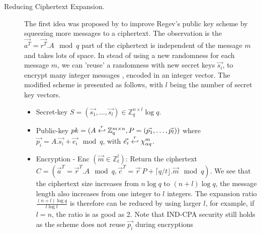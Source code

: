 \begin{description}
            \begin{description}
                \item[Reducing Ciphertext Expansion.] The first idea was proposed by
                    \cite{peikert2008framework} to improve Regev's public key scheme by
                    squeezing more messages to a ciphertext.
                    The observation is the $\vec{a^T} = \vec{r^T}. A
                    \mod q$ part of the ciphertext is independent of the message
                    $m$ and takes lots of space. In stead of using a new
                    randomness for each message $m$, we can 'reuse' a randomness
                    with new secret keys $\vec{s_i}$, to encrypt many integer
                    messages , encoded in an integer vector. The modified scheme
                    is presented as follows, with $l$ being the number of secret
                    key vectors.
                    \begin{itemize}
                        \item Secret-key $S = (\vec{s_1}, \dots, \vec{s_l}) \in
                            \mathbb{Z}_q^{n \times l} \log q$.
                        \item Public-key $pk = (A \stackrel{r}{\hookleftarrow} \mathbb{Z}_q^{m
                            \times n},P=(\vec{p_1}, \dots, \vec{p_l}))$ where
                            $\vec{p_i} = A.\vec{s_i} + \vec{e_i} \mod q$, with
                            $\vec{e_i} \stackrel{r}{\hookleftarrow} \chi_{\alpha q}^m$.
                        \item Encryption - Enc $(\vec{m} \in \mathbb{Z}_t^l)$:
                            Return the ciphertext $C = (\vec{a}^T=
                            \vec{r}^T.A \mod q, \vec{c}^T = \vec{r}^.P + \lceil
                        q/t \rfloor . \vec{m} \mod q)$. We see that the
                        ciphertext size increases from $n\log q$ to $(n+l)\log
                        q$, the message length also increases from one integer
                        to $l$ integers. The expansion ratio
                        $\frac{(n+l)\log q}{l \log t}$ is therefore can be
                        reduced by using larger $l$, for example, if $l=n$, the
                        ratio is as good as 2. Note that IND-CPA security still
                        holds as the scheme does not reuse $\vec{p_i}$ during
                        encryptions 
\end{itemize}
\end{description}
\end{description}

